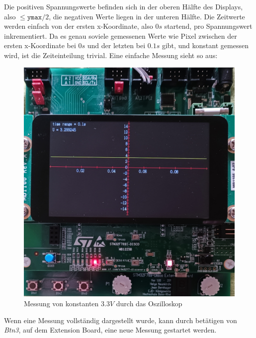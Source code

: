 Die positiven Spannungswerte befinden sich in der oberen Hälfte des Displays, also $\le \texttt{ymax}/2$,
die negativen Werte liegen in der unteren Hälfte. \newline
Die Zeitwerte werden einfach von der ersten x-Koordinate, also $0s$ startend, pro Spannungswert inkrementiert.
Da es genau soviele gemessenen Werte wie Pixel zwischen der ersten x-Koordinate bei $0s$
und der letzten bei $0.1s$ gibt, und konstant gemessen wird, ist die Zeiteinteilung trivial. \newline
Eine einfache Messung sieht so aus:
\begin{figure}[h]
	\centering
	\includegraphics[scale=0.125]{images/messung3.3V.jpg}
	\caption{Messung von konstanten $3.3V$ durch das Oszilloskop}
\end{figure}
\newline
Wenn eine Messung vollständig dargestellt wurde, kann durch betätigen von \textit{Btn3},
auf dem Extension Board, eine neue Messung gestartet werden.

